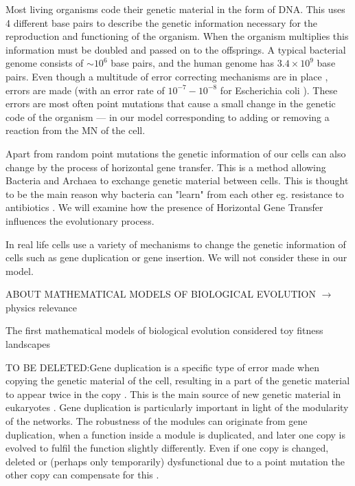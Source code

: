 \documentclass[10pt,a4paper]{article}
\begin{document}
	Most living organisms code their genetic material in the form of DNA. This uses 4 different base pairs to describe the genetic information necessary for the reproduction and functioning of the organism. When the organism multiplies this information must be doubled and passed on to the offsprings. A typical bacterial genome consists of $\sim 10^6$ base pairs, and the human genome has $3.4 \times 10^9$ base pairs. Even though a multitude of error correcting mechanisms are in place \cite{dnarepair}, errors are made (with an error rate of $10^{-7} - 10^{-8}$ for Escherichia coli \cite{dnaerrorrate}). These errors are most often point mutations that cause a small change in the genetic code of the organism --- in our model  corresponding to adding or removing a reaction from the MN of the cell.

	Apart from random point mutations  the genetic information of our cells can also change by the process of horizontal gene transfer. This is a method allowing Bacteria and Archaea to exchange genetic material between cells. This is thought to be the main reason why bacteria can "learn" from each other eg. resistance to antibiotics \cite{horizontalAntibiotics}\cite{horizontalgenetransfer}. We will examine how the presence of Horizontal Gene Transfer influences the evolutionary process.

	In real life cells use a variety of mechanisms to change the genetic information of cells such as gene duplication or gene insertion. We will not consider these in our model. 

	ABOUT MATHEMATICAL MODELS OF BIOLOGICAL EVOLUTION $\rightarrow$ physics relevance

	The first mathematical models of biological evolution considered toy fitness landscapes 

	TO BE DELETED:Gene duplication is a specific type of error made when copying the genetic material of the cell, resulting in a part of the genetic material to appear twice in the copy \cite{geneduplication}. This is the main source of new genetic material in eukaryotes \cite{horizontalgenetransfer}. Gene duplication is particularly important in light of the modularity of the networks. The robustness of the modules can originate from gene duplication, when a function inside a module is duplicated, and later one copy is evolved to fulfil the function slightly differently. Even if one copy is changed, deleted or (perhaps only temporarily) dysfunctional due to a point mutation the other copy can compensate for this \cite{duplicaterole} \cite{complexfeatures}. 
	
\end{document}

